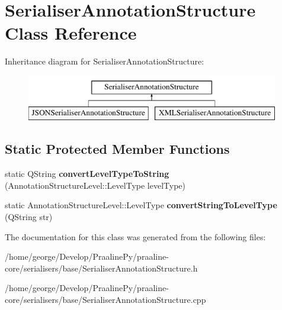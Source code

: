 \hypertarget{class_serialiser_annotation_structure}{}\section{Serialiser\+Annotation\+Structure Class Reference}
\label{class_serialiser_annotation_structure}
Inheritance diagram for Serialiser\+Annotation\+Structure\+:\begin{figure}[H]
\begin{center}
\leavevmode
\includegraphics[height=2.000000cm]{class_serialiser_annotation_structure}
\end{center}
\end{figure}
\subsection*{Static Protected Member Functions}
\begin{DoxyCompactItemize}
\item 
\mbox{\label{class_serialiser_annotation_structure_a0562fbe7c989e3d207b4ec9cc4f3a66f}} 
static Q\+String {\bfseries convert\+Level\+Type\+To\+String} (Annotation\+Structure\+Level\+::\+Level\+Type level\+Type)
\item 
\mbox{\label{class_serialiser_annotation_structure_a3d30ddcf2705c2c0c01141f3990a71cb}} 
static Annotation\+Structure\+Level\+::\+Level\+Type {\bfseries convert\+String\+To\+Level\+Type} (Q\+String str)
\end{DoxyCompactItemize}


The documentation for this class was generated from the following files\+:\begin{DoxyCompactItemize}
\item 
/home/george/\+Develop/\+Praaline\+Py/praaline-\/core/serialisers/base/Serialiser\+Annotation\+Structure.\+h\item 
/home/george/\+Develop/\+Praaline\+Py/praaline-\/core/serialisers/base/Serialiser\+Annotation\+Structure.\+cpp\end{DoxyCompactItemize}
